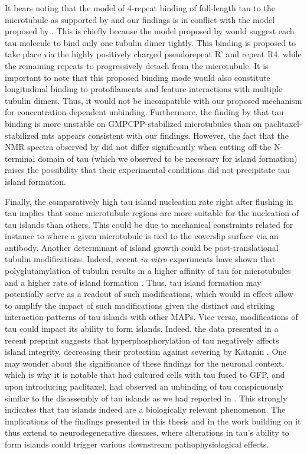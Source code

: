 It bears noting that the model of 4-repeat binding of full-length tau to the microtubule as supported by \cite{Kellogg2018} and our findings is in conflict with the model proposed by \cite{Mammeri}. This is chiefly because the model proposed by \cite{Mammeri} would suggest each tau molecule to bind only one tubulin dimer tightly. This binding is proposed to take place via the highly positively charged pseudorepeat R' and repeat R4, while the remaining repeats to progressively detach from the microtubule. It is important to note that this proposed binding mode would also constitute longitudinal binding to protofilaments and feature interactions with multiple tubulin dimers. Thus, it would not be incompatible with our proposed mechanism for concentration-dependent unbinding. Furthermore, the finding by \cite{Mammeri} that tau binding is more unstable on GMPCPP-stabilized microtubules than on paclitaxel-stabilized mts appears consistent with our findings. However, the fact that the NMR spectra observed by \cite{Mammeri} did not differ significantly when cutting off the N-terminal domain of tau (which we observed to be necessary for island formation) raises the possibility that their experimental conditions did not precipitate tau island formation.\par

Finally, the comparatively high tau island nucleation rate right after flushing in tau  implies that some microtubule regions are more suitable for the nucleation of tau islands than others. This could be due to mechanical constraints related for instance to where a given microtubule is tied to the coverslip surface via an antibody. Another determinant of island growth could be post-translational tubulin modifications. Indeed, recent \textit{in vitro} experiments have shown that polyglutamylation of tubulin results in a higher affinity of tau for microtubules and a higher rate of island formation . Thus, tau island formation may potentially serve as a readout of such modifications, which would in effect allow to amplify the impact of such modifications given the distinct and striking interaction patterns of tau islands with other MAPs. Vice versa, modifications of tau could impact its ability to form islands. Indeed, the data presented in a recent preprint suggests that hyperphosphorylation of tau negatively affects island integrity, decreasing their protection against severing by Katanin . One may wonder about the significance of these findings for the neuronal context, which is why it is notable that \cite{siahaan2022microtubule} had cultured cells with tau fused to GFP, and upon introducing paclitaxel, had observed an unbinding of tau conspicuously similar to the disassembly of tau islands as we had reported in . This strongly indicates that tau islands indeed are a biologically relevant phenomenon. The implications of the findings presented in this thesis and in the work building on it thus extend to neurodegenerative diseases, where alterations in tau's ability to form islands could trigger various downstream pathophysiological effects.